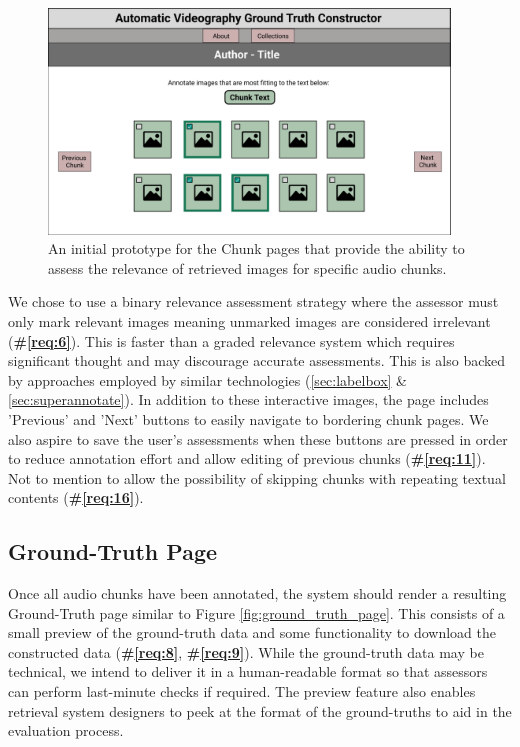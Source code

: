 \documentclass{l4proj}
\begin{document}
\begin{figure}
    \centering
    \includegraphics[width=0.95\textwidth]{figures/chunk_page.pdf}
    \caption{An initial prototype for the Chunk pages that provide the ability to assess the relevance of retrieved images for specific audio chunks.}
    \label{fig:chunk_page}
\end{figure}

We chose to use a binary relevance assessment strategy where the assessor must only mark relevant images meaning unmarked images are considered irrelevant (\textbf{\#\ref{req:6}}). This is faster than a graded relevance system which requires significant thought and may discourage accurate assessments. This is also backed by approaches employed by similar technologies (\ref{sec:labelbox} \& \ref{sec:superannotate}). In addition to these interactive images, the page includes 'Previous' and 'Next' buttons to easily navigate to bordering chunk pages. We also aspire to save the user's assessments when these buttons are pressed in order to reduce annotation effort and allow editing of previous chunks (\textbf{\#\ref{req:11}}). Not to mention to allow the possibility of skipping chunks with repeating textual contents (\textbf{\#\ref{req:16}}).

\subsection{Ground-Truth Page}
Once all audio chunks have been annotated, the system should render a resulting Ground-Truth page similar to Figure \ref{fig:ground_truth_page}. This consists of a small preview of the ground-truth data and some functionality to download the constructed data (\textbf{\#\ref{req:8}}, \textbf{\#\ref{req:9}}). While the ground-truth data may be technical, we intend to deliver it in a human-readable format so that assessors can perform last-minute checks if required. The preview feature also enables retrieval system designers to peek at the format of the ground-truths to aid in the evaluation process.
\end{document}
